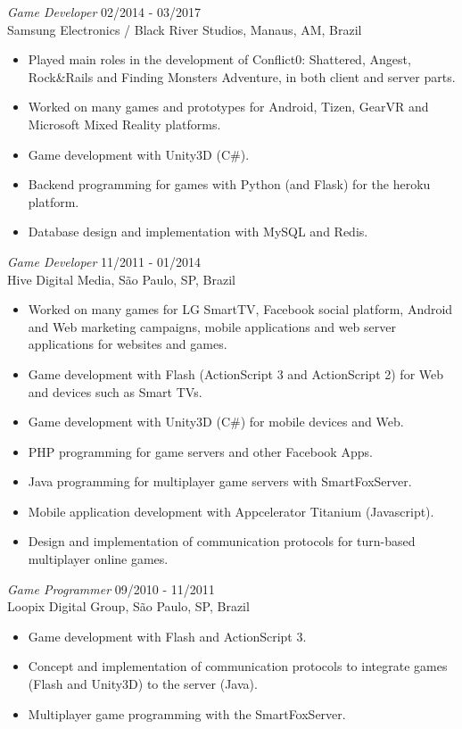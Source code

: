 \documentclass[line,margin]{res}
\begin{document}
\begin{resume}
                {\sl Game Developer} \hfill 02/2014 - 03/2017 \\
                Samsung Electronics / Black River Studios, Manaus, AM, Brazil
                 \begin{itemize}  \itemsep 1.25pt
                 \item Played main roles in the development of Conflict0: Shattered, Angest, Rock\&Rails and Finding Monsters Adventure, in both client and server parts.
                 \item Worked on many games and prototypes for Android, Tizen, GearVR and Microsoft Mixed Reality platforms.
                 \item Game development with Unity3D (C\#).
				 \item Backend programming for games with Python (and Flask) for the heroku platform.
                 \item Database design and implementation with MySQL and Redis.
                 \end{itemize}
                 
				{\sl Game Developer} \hfill 11/2011 - 01/2014 \\
                Hive Digital Media, São Paulo, SP, Brazil
                 \begin{itemize}  \itemsep 1.25pt
                 \item Worked on many games for LG SmartTV, Facebook social platform, Android and Web marketing campaigns, mobile applications and web server applications for websites and games.
                 \item Game development with Flash (ActionScript 3 and ActionScript 2) for Web and devices such as Smart TVs.
		 		 \item Game development with Unity3D (C\#) for mobile devices and Web.
                 \item PHP programming for game servers and other Facebook Apps.
                 \item Java programming for multiplayer game servers with SmartFoxServer.
		 		 \item Mobile application development with Appcelerator Titanium (Javascript).
                 \item Design and implementation of communication protocols for turn-based multiplayer online games.
                 \end{itemize}
                 
                {\sl Game Programmer} \hfill 09/2010 - 11/2011 \\
                Loopix Digital Group, São Paulo, SP, Brazil
                 \begin{itemize}  \itemsep 1.25pt
                 \item Game development with Flash and ActionScript 3.
                 \item Concept and implementation of communication protocols to integrate games (Flash and Unity3D) to the server (Java).
                 \item Multiplayer game programming with the SmartFoxServer.
                 \end{itemize}
 

\end{resume}
\end{document}
